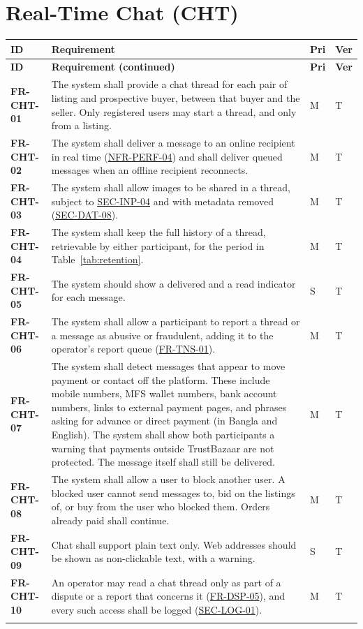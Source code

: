 \documentclass[11pt,a4paper]{report}
\makeatletter
\newenvironment{reqs}{%
  \small
  \begin{longtable}{@{}>{\raggedright\arraybackslash}p{2.35cm}
                       >{\raggedright\arraybackslash}p{10.3cm}
                       >{\centering\arraybackslash}p{0.7cm}
                       >{\centering\arraybackslash}p{0.7cm}@{}}
  \toprule
  \textbf{ID} & \textbf{Requirement} & \textbf{Pri} & \textbf{Ver} \\
  \midrule
  \endfirsthead
  \toprule
  \textbf{ID} & \textbf{Requirement (continued)} & \textbf{Pri} & \textbf{Ver} \\
  \midrule
  \endhead
  \bottomrule
  \endfoot
}{\end{longtable}}
\newcommand{\req}[5]{\leavevmode\textbf{#1}\hypertarget{#1}{} & #5 & #2 & #3 \\ \addlinespace[2pt]}
\newcommand{\rr}[1]{\hyperlink{#1}{#1}}
\makeatother
\begin{document}
\section{Real-Time Chat (CHT)}
\begin{reqs}
\req{FR-CHT-01}{M}{T}{FR-59}{The system shall provide a chat thread for each pair of listing and prospective buyer, between that buyer and the seller. Only registered users may start a thread, and only from a listing.}
\req{FR-CHT-02}{M}{T}{FR-60}{The system shall deliver a message to an online recipient in real time (\rr{NFR-PERF-04}) and shall deliver queued messages when an offline recipient reconnects.}
\req{FR-CHT-03}{M}{T}{FR-61}{The system shall allow images to be shared in a thread, subject to \rr{SEC-INP-04} and with metadata removed (\rr{SEC-DAT-08}).}
\req{FR-CHT-04}{M}{T}{FR-62}{The system shall keep the full history of a thread, retrievable by either participant, for the period in Table~\ref{tab:retention}.}
\req{FR-CHT-05}{S}{T}{FR-63}{The system should show a delivered and a read indicator for each message.}
\req{FR-CHT-06}{M}{T}{FR-64}{The system shall allow a participant to report a thread or a message as abusive or fraudulent, adding it to the operator's report queue (\rr{FR-TNS-01}).}
\req{FR-CHT-07}{M}{T}{new}{The system shall detect messages that appear to move payment or contact off the platform. These include mobile numbers, MFS wallet numbers, bank account numbers, links to external payment pages, and phrases asking for advance or direct payment (in Bangla and English). The system shall show both participants a warning that payments outside TrustBazaar are not protected. The message itself shall still be delivered.}
\req{FR-CHT-08}{M}{T}{new}{The system shall allow a user to block another user. A blocked user cannot send messages to, bid on the listings of, or buy from the user who blocked them. Orders already paid shall continue.}
\req{FR-CHT-09}{S}{T}{new}{Chat shall support plain text only. Web addresses should be shown as non-clickable text, with a warning.}
\req{FR-CHT-10}{M}{T}{new}{An operator may read a chat thread only as part of a dispute or a report that concerns it (\rr{FR-DSP-05}), and every such access shall be logged (\rr{SEC-LOG-01}).}
\end{reqs}
\end{document}
